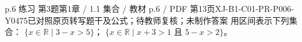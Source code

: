 \par\noindent\begin{minipage}{\linewidth}
\begin{bankitem}{p.6 练习 第3题}{第1章 / 1.1 集合 / 教材 p.6 / PDF 第13页}{XJ-B1-C01-PR-P006-Y0475}{已对照原页转写题干及公式；待教师复核；未制作答案}
用区间表示下列集合：
$\{x\in\mathbb R\mid 3-x>5\}$；
$\{x\in\mathbb R\mid x+3>1\text{ 且 }5-x>2\}$。
\end{bankitem}
\end{minipage}\par\medskip
